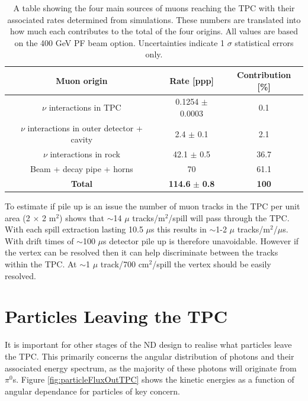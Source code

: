 \begin{table}[htbp]
\centering
\begin{tabular}{ccc}
	\hline
	 \textbf{Muon origin} & \textbf{Rate [ppp]}& \textbf{Contribution [\%]}\\
	 \hline
	 $\nu$ interactions in TPC & 0.1254 $\pm$ 0.0003 & 0.1\\
	 $\nu$ interactions in outer detector + cavity & 2.4 $\pm$ 0.1 & 2.1\\
	 $\nu$ interactions in rock & 42.1 $\pm$ 0.5 & 36.7 \\
	 Beam + decay pipe + horns & 70 & 61.1 \\
	\hline
	\textbf{Total} & \textbf{114.6} $\boldsymbol{\pm}$ \textbf{0.8} & \textbf{100}\\
	\hline
\end{tabular}
\caption{A table showing the four main sources of muons reaching the TPC with their associated rates determined from simulations. These numbers are translated into how much each contributes to the total of the four origins. All values are based on the 400 GeV PF beam option. Uncertainties indicate 1 $\sigma$ statistical errors only.}
\label{tab:muonRates}
\end{table}

To estimate if pile up is an issue the number of muon tracks in the TPC per unit area (2 $\times$ 2 m$^{2}$) shows that $\sim$14 $\mu$ tracks/m$^{2}$/spill will pass through the TPC. With each spill extraction lasting 10.5 $\mu$s this results in $\sim$1-2 $\mu$ tracks/m$^{2}$/$\mu$s. With drift times of $\sim$100 $\mu$s detector pile up is therefore unavoidable. However if the vertex can be resolved then it can help discriminate between the tracks within the TPC. At $\sim$1 $\mu$ track/700 cm$^{2}$/spill the vertex should be easily resolved.

\section{Particles Leaving the TPC}
It is important for other stages of the ND design to realise what particles leave the TPC. This primarily concerns the angular distribution of photons and their associated energy spectrum, as the majority of these photons will originate from $\pi^{0}$s. Figure \ref{fig:particleFluxOutTPC} shows the kinetic energies as a function of angular dependance for particles of key concern. 

